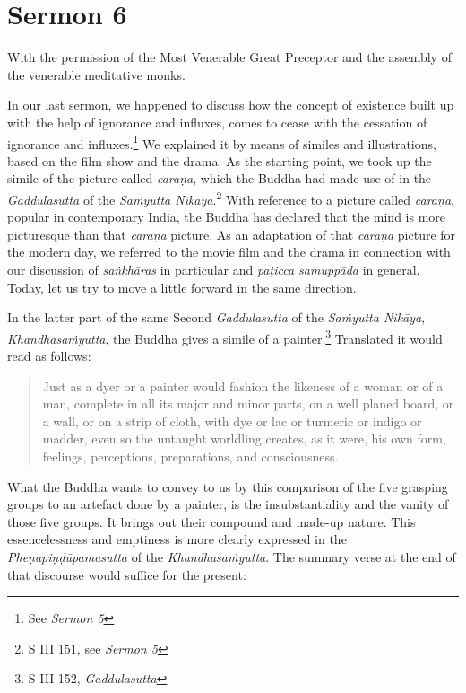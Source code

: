 \chapter{Sermon 6}

\NibbanaOpeningQuote

With the permission of the Most Venerable Great Preceptor and the assembly of the venerable meditative monks.

In our last sermon, we happened to discuss how the concept of existence built up with the help of ignorance and influxes, comes to cease with the cessation of ignorance and influxes.\footnote{See \emph{Sermon 5}} We explained it by means of similes and illustrations, based on the film show and the drama. As the starting point, we took up the simile of the picture called \emph{caraṇa}, which the Buddha had made use of in the \emph{Gaddulasutta} of the \emph{Saṁyutta Nikāya}.\footnote{S III 151, see \emph{Sermon 5}} With reference to a picture called \emph{caraṇa}, popular in contemporary India, the Buddha has declared that the mind is more picturesque than that \emph{caraṇa} picture. As an adaptation of that \emph{caraṇa} picture for the modern day, we referred to the movie film and the drama in connection with our discussion of \emph{saṅkhāras} in particular and \emph{paṭicca samuppāda} in general. Today, let us try to move a little forward in the same direction.

In the latter part of the same Second \emph{Gaddulasutta} of the \emph{Saṁyutta Nikāya}, \emph{Khandhasaṁyutta}, the Buddha gives a simile of a painter.\footnote{S III 152, \emph{Gaddulasutta}} Translated it would read as follows:

\begin{quote}
Just as a dyer or a painter would fashion the likeness of a woman or of a man, complete in all its major and minor parts, on a well planed board, or a wall, or on a strip of cloth, with dye or lac or turmeric or indigo or madder, even so the untaught worldling creates, as it were, his own form, feelings, perceptions, preparations, and consciousness.
\end{quote}

What the Buddha wants to convey to us by this comparison of the five grasping groups to an artefact done by a painter, is the insubstantiality and the vanity of those five groups. It brings out their compound and made-up nature. This essencelessness and emptiness is more clearly expressed in the \emph{Pheṇapiṇḍūpamasutta} of the \emph{Khandhasaṁyutta}. The summary verse at the end of that discourse would suffice for the present:

